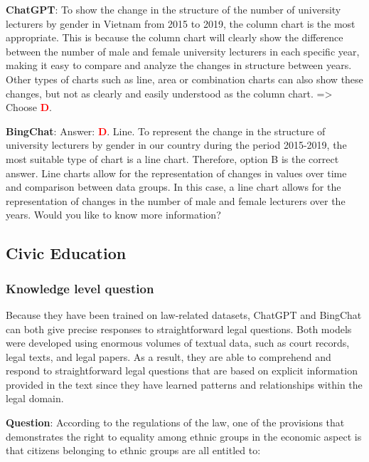 \documentclass{article}
\begin{document}
{\begin{mdframed}[linewidth=1pt,linecolor=red]
		\textbf{ChatGPT}: To show the change in the structure of the number of university lecturers by gender in Vietnam from 2015 to 2019, the column chart is the most appropriate. This is because the column chart will clearly show the difference between the number of male and female university lecturers in each specific year, making it easy to compare and analyze the changes in structure between years. Other types of charts such as line, area or combination charts can also show these changes, but not as clearly and easily understood as the column chart. => Choose \textcolor{red}{\textbf{D}}. 
		
		\textbf{BingChat}: Answer: \textcolor{red}{\textbf{D}}. Line. To represent the change in the structure of university lecturers by gender in our country during the period 2015-2019, the most suitable type of chart is a line chart. Therefore, option B is the correct answer. Line charts allow for the representation of changes in values over time and comparison between data groups. In this case, a line chart allows for the representation of changes in the number of male and female lecturers over the years. Would you like to know more information?
		
		
	\end{mdframed}	
	
	\subsection{Civic Education}


	\label{VNHSGE_Civ}
	
	\subsubsection{Knowledge level question}
	\label{VNHSGE_Civ_K}
	
	Because they have been trained on law-related datasets, ChatGPT and BingChat can both give precise responses to straightforward legal questions. Both models were developed using enormous volumes of textual data, such as court records, legal texts, and legal papers. As a result, they are able to comprehend and respond to straightforward legal questions that are based on explicit information provided in the text since they have learned patterns and relationships within the legal domain.
	
	
	
	\begin{mdframed}[linewidth=1pt,linecolor=red] \textbf{Question}: According to the regulations of the law, one of the provisions that demonstrates the right to equality among ethnic groups in the economic aspect is that citizens belonging to ethnic groups are all entitled to:
		

\end{mdframed}}
\end{document}
